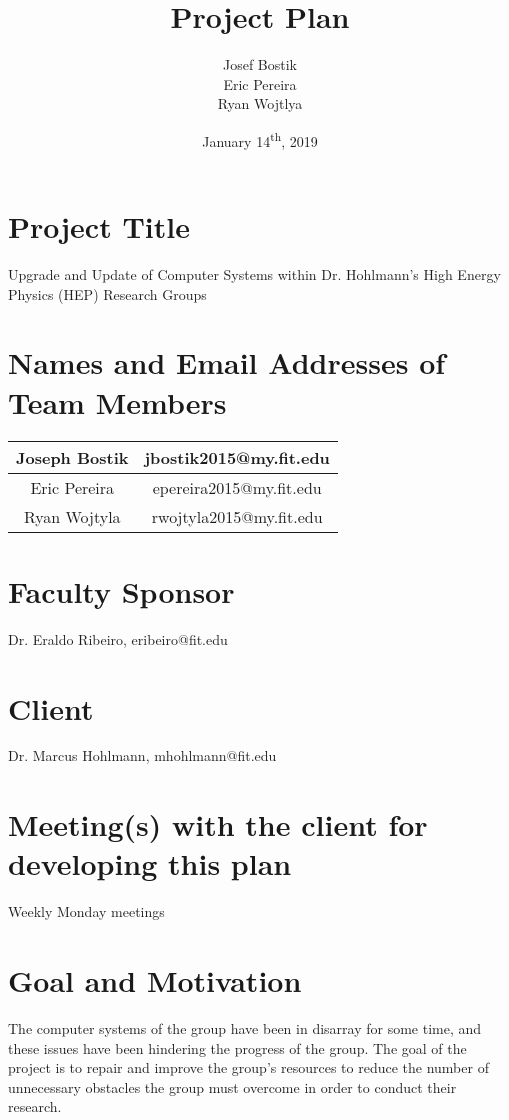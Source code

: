 \documentclass[12pt]{article}
\newcommand\tab[1][1cm]{\hspace*{#1}}
\begin{document}
\begin{titlepage}
	

\author{Josef Bostik\\
	Eric Pereira\\
	Ryan Wojtlya\\}
\date{January 14\textsuperscript{th}, 2019}
\title{Project Plan}
\maketitle
\end{titlepage}
\tableofcontents
\newpage
{}

\section{Project Title}
\tab Upgrade and Update of Computer Systems within Dr. Hohlmann's High Energy Physics (HEP) Research Groups
\section{Names and Email Addresses of Team Members}
\tab
\begin{tabular}{| c | c |}
	\hline
	Joseph Bostik & jbostik2015@my.fit.edu \\
	\hline
	Eric Pereira & epereira2015@my.fit.edu \\
	\hline
	Ryan Wojtyla & rwojtyla2015@my.fit.edu \\
	\hline
\end{tabular}

\section{Faculty Sponsor}
Dr. Eraldo Ribeiro, eribeiro@fit.edu

\section{Client}
Dr. Marcus Hohlmann, mhohlmann@fit.edu

\section{Meeting(s) with the client for developing this plan}
\tab Weekly Monday meetings

\section{Goal and Motivation}
\tab The computer systems of the group have been in disarray for
some time, and these issues have been hindering the progress of
the group. The goal of the project is to repair and improve the
group’s resources to reduce the number of unnecessary obstacles
the group must overcome in order to conduct their research.
\end{document}
